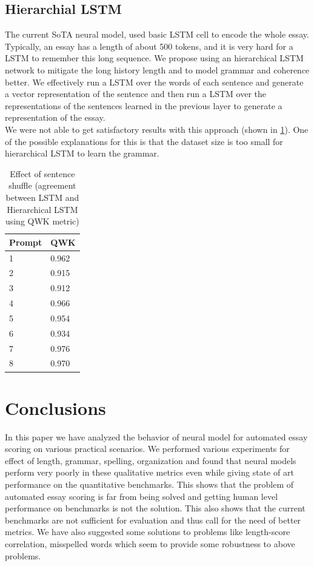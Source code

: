 \documentclass[11pt,a4paper]{article}
\newcommand{\acomment}[1]{{\bf{\color{blue}{{[Aman: #1]}}}}}
\begin{document}
  


\subsection{Hierarchial LSTM}

The current SoTA neural model, used basic LSTM cell to encode the whole essay. Typically, an essay has a length of about 500 tokens, and it is very hard for a LSTM to remember this long sequence. We propose using an hierarchical LSTM network to mitigate the long history length and to model grammar and coherence better. We effectively run a LSTM over the words of each sentence and generate a vector representation of the sentence and then run a LSTM over the representations of the sentences learned in the previous layer to generate a representation of the essay.\\ 
We were not able to get satisfactory results with this approach (shown in \cref{hlstm}). One of the possible explanations for this is that the dataset size is too small for hierarchical LSTM to learn the grammar.


\begin{table}[]
  \centering
  \begin{tabular}{|l|l|}
  \hline
  \textbf{Prompt} & \textbf{QWK} \\ \hline
  1 & 0.962 \\ \hline
  2 & 0.915 \\ \hline
  3 & 0.912 \\ \hline
  4 & 0.966 \\ \hline
  5 & 0.954 \\ \hline
  6 & 0.934 \\ \hline
  7 & 0.976 \\ \hline
  8 & 0.970 \\ \hline
  \end{tabular}
  \caption{Effect of sentence shuffle (agreement between LSTM and Hierarchical LSTM using QWK metric)}
  \label{hlstm}
\end{table}


\section{Conclusions}
In this paper we have analyzed the behavior of neural model for automated essay scoring on various practical scenarios. We performed various experiments for effect of length, grammar, spelling, organization and found that neural models perform very poorly in these qualitative metrics even while giving state of art performance on the quantitative benchmarks. This shows that the problem of automated essay scoring is far from being solved and getting human level performance on benchmarks is not the solution. This also shows that the current benchmarks are not sufficient for evaluation and thus call for the need of better metrics. We have also suggested some solutions to problems like length-score correlation, misspelled words which seem to provide some robustness to above problems.




\end{document}
